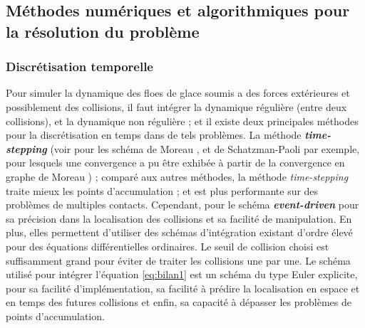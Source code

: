 \subsection{Méthodes numériques et algorithmiques pour la résolution du problème}
 
\subsubsection{Discrétisation temporelle}

Pour simuler la dynamique des floes de glace soumis a des forces extérieures et possiblement des collisions, il faut intégrer la dynamique régulière (entre deux collisions), et la dynamique non régulière ; et il existe deux principales méthodes pour la discrétisation en temps dans de tels problèmes. La méthode \textit{\textbf{time-stepping}} (voir \parencite{acary2013projected} pour les schéma de Moreau \parencite{moreau1986dynamique,jean1999non}, et de Schatzman-Paoli \parencite{paoli2002numerical,paoli2002numerical2} par exemple, pour lesquels une convergence a pu être exhibée à partir de la convergence en graphe de Moreau \parencite{moreau1978approximation}) ; comparé aux autres méthodes, la méthode \textit{time-stepping} traite mieux les points d'accumulation \parencite[p.58]{rabatel2015thesis} ; et est plus performante sur des problèmes de multiples contacts. Cependant, \citeauthor{rabatel2015thesis} pour le schéma \textit{\textbf{event-driven}} pour sa précision dans la localisation des collisions et sa facilité de manipulation. En plus, elles permettent d’utiliser des schémas d’intégration existant d’ordre élevé pour des équations différentielles ordinaires. Le seuil de collision choisi est suffisamment grand pour éviter de traiter les collisions une par une. Le schéma utilisé pour intégrer l'équation \cref{eq:bilan1} est un schéma du type Euler explicite, pour sa facilité d’implémentation, sa facilité à prédire la localisation en espace et en temps des futures collisions et enfin, sa capacité à dépasser les problèmes de points d’accumulation. 

